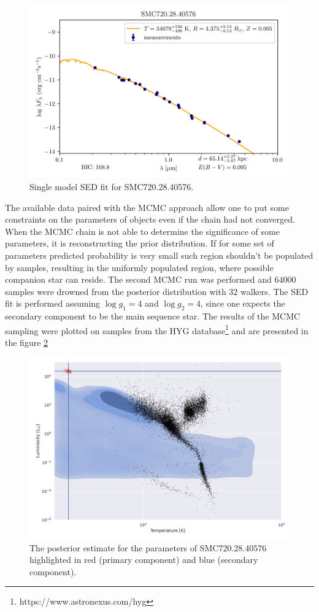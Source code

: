 \documentclass{pracalicmgr}
\begin{document}
\begin{figure}[H]
    \centering
    \includegraphics[scale=1]{plots/SMC720.28.40576_simple_emcee.png}
    \caption{Single model SED fit for SMC720.28.40576.}
    \label{SMC720:sed}
\end{figure}
The available data paired with the MCMC approach allow one to put some constraints on the parameters of objects even if the chain had not converged. 
When the MCMC chain is not able to determine the significance of some parameters, it is reconstructing the prior distribution.
If for some set of parameters predicted probability is very small
such region shouldn't be populated by samples, resulting in the uniformly populated region, where possible companion star can reside.
The second MCMC run was performed and $64000$ samples were drowned from the posterior distribution with $32$ walkers. 
The SED fit is performed assuming $\log g_1=4$ and $\log g_2=4$, since one expects the secondary component to be the
main sequence star. 
The results of the MCMC sampling were plotted on samples from the HYG
database\footnote{https://www.astronexus.com/hyg} and are presented in the figure \ref{posterior}
\begin{figure}[H]
    \includegraphics[scale=0.6]{plots/posterior_estimate_SMC720.png}
    \caption{The posterior estimate for the parameters of SMC720.28.40576 highlighted in red (primary component)
    and blue (secondary component).}\label{posterior}
\end{figure}
\end{document}
